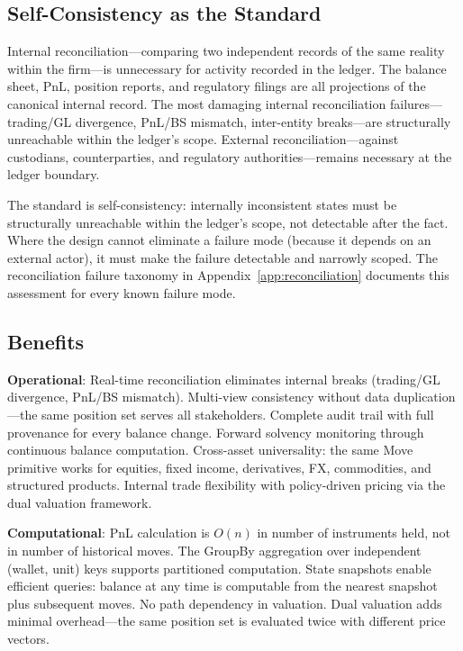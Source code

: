 \documentclass[11pt,a4paper]{article}
\begin{document}
\subsection{Self-Consistency as the Standard}

Internal reconciliation---comparing two independent records of the same reality within the firm---is unnecessary for activity recorded in the ledger. The balance sheet, PnL, position reports, and regulatory filings are all projections of the canonical internal record. The most damaging internal reconciliation failures---trading/GL divergence, PnL/BS mismatch, inter-entity breaks---are structurally unreachable within the ledger's scope. External reconciliation---against custodians, counterparties, and regulatory authorities---remains necessary at the ledger boundary.

The standard is self-consistency: internally inconsistent states must be structurally unreachable within the ledger's scope, not detectable after the fact. Where the design cannot eliminate a failure mode (because it depends on an external actor), it must make the failure detectable and narrowly scoped. The reconciliation failure taxonomy in Appendix~\ref{app:reconciliation} documents this assessment for every known failure mode.

\subsection{Benefits}

\noindent\textbf{Operational}: Real-time reconciliation eliminates internal breaks (trading/GL divergence, PnL/BS mismatch). Multi-view consistency without data duplication---the same position set serves all stakeholders. Complete audit trail with full provenance for every balance change. Forward solvency monitoring through continuous balance computation. Cross-asset universality: the same Move primitive works for equities, fixed income, derivatives, FX, commodities, and structured products. Internal trade flexibility with policy-driven pricing via the dual valuation framework.

\noindent\textbf{Computational}: PnL calculation is $O(n)$ in number of instruments held, not in number of historical moves. The GroupBy aggregation over independent (wallet, unit) keys supports partitioned computation. State snapshots enable efficient queries: balance at any time is computable from the nearest snapshot plus subsequent moves. No path dependency in valuation. Dual valuation adds minimal overhead---the same position set is evaluated twice with different price vectors.
\end{document}
